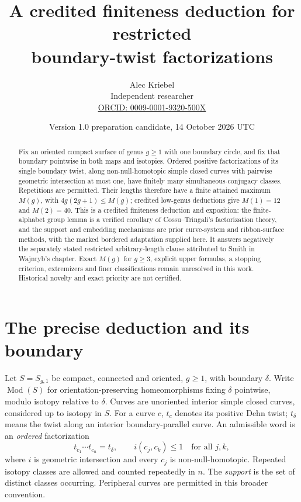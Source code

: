 \documentclass[11pt]{article}
\title{A credited finiteness deduction for restricted\protect\\ boundary-twist factorizations}
\author{Alec Kriebel\\Independent researcher\\
\small\href{https://orcid.org/0009-0001-9320-500X}{ORCID: 0009-0001-9320-500X}}
\date{Version 1.0 preparation candidate, 14 October 2026 UTC}
\newcommand{\Mod}{\operatorname{Mod}}
\begin{document}
\maketitle
\begin{abstract}
Fix an oriented compact surface of genus $g\geq1$ with one boundary circle, and fix that boundary pointwise in both maps and isotopies. Ordered positive factorizations of its single boundary twist, along non-null-homotopic simple closed curves with pairwise geometric intersection at most one, have finitely many simultaneous-conjugacy classes. Repetitions are permitted. Their lengths therefore have a finite attained maximum $M(g)$, with $4g(2g+1)\leq M(g)$; credited low-genus deductions give $M(1)=12$ and $M(2)=40$. This is a credited finiteness deduction and exposition: the finite-alphabet group lemma is a verified corollary of Cossu--Tringali's factorization theory, and the support and embedding mechanisms are prior curve-system and ribbon-surface methods, with the marked bordered adaptation supplied here. It answers negatively the separately stated restricted arbitrary-length clause attributed to Smith in Wajnryb's chapter. Exact $M(g)$ for $g\geq3$, explicit upper formulas, a stopping criterion, extremizers and finer classifications remain unresolved in this work. Historical novelty and exact priority are not certified.
\end{abstract}

\section{The precise deduction and its boundary}
Let $S=S_{g,1}$ be compact, connected and oriented, $g\geq1$, with boundary $\delta$. Write $\Mod(S)$ for orientation-preserving homeomorphisms fixing $\delta$ pointwise, modulo isotopy relative to $\delta$. Curves are unoriented interior simple closed curves, considered up to isotopy in $S$. For a curve $c$, $t_c$ denotes its positive Dehn twist; $t_\delta$ means the twist along an interior boundary-parallel curve. An admissible word is an \emph{ordered} factorization
\begin{equation}\label{eq:target}
 t_{c_1}\cdots t_{c_n}=t_\delta,\qquad i(c_j,c_k)\leq1\quad\text{for all }j,k,
\end{equation}
where $i$ is geometric intersection and every $c_j$ is non-null-homotopic. Repeated isotopy classes are allowed and counted repeatedly in $n$. The \emph{support} is the set of distinct classes occurring. Peripheral curves are permitted in this broader convention.
\end{document}
